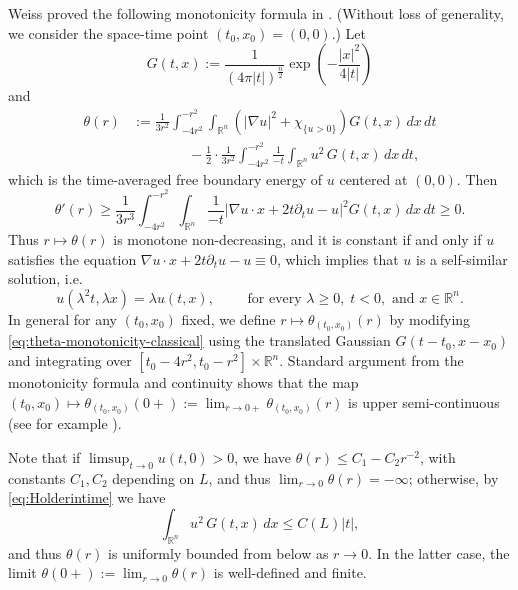 \documentclass[11pt]{article}
\numberwithin{equation}{section}
\theoremstyle{definition}
\newcommand{\RR}{\mathbb{R}}
\begin{document}
Weiss proved the following monotonicity formula in \cite[Theorem 3.1]{Weiss99}. (Without loss of generality, we consider the space-time point $(t_0, x_0) = (0,0)$.) Let
\[ G(t,x) := \frac{1}{(4\pi|t|)^{\frac{n}{2}}} \exp\left(-\frac{|x|^2}{4|t|} \right) \]
and
\begin{align}
    \theta(r) & := \frac{1}{3r^2} \int_{-4r^2}^{-r^2} \int_{\RR^n} \left(|\nabla u|^2 + \chi_{\{u>0\}} \right) G(t,x) \, dx\, dt \nonumber \\
	& \qquad \qquad - \frac12 \cdot \frac{1}{3r^2} \int_{-4r^2}^{-r^2} \frac{1}{-t} \int_{\RR^n}  u^2\, G(t,x) \, dx\, dt,\label{def:theta}
\end{align}
which is the time-averaged free boundary energy of $u$ centered at $(0,0)$.
Then
\begin{equation} \label{eq:theta-monotonicity-classical}
	\theta'(r) \geq \frac{1}{3r^3} \int_{-4r^2}^{-r^2} \int_{\RR^n} \frac{1}{-t}\left|\nabla u \cdot x + 2t \partial_t u - u \right|^2 G(t,x) \, dx\,dt \geq 0.
\end{equation}
Thus $r \mapsto \theta(r)$ is monotone non-decreasing, and it is constant if and only if $u$ satisfies the equation $\nabla u \cdot x + 2t \partial_t u - u \equiv 0$, which implies that $u$ is a self-similar solution, i.e.
\[ u(\lambda^2 t, \lambda x) = \lambda u(t,x), \qquad \text{ for every }\lambda \geq 0,\; t<0,\text{ and } x\in \RR^n. \]
In general for any $(t_0,x_0)$ fixed, we define $r \mapsto \theta_{(t_0,x_0)}(r)$ by modifying \eqref{eq:theta-monotonicity-classical} using the translated Gaussian $G(t-t_0, x-x_0)$ and integrating over $[t_0-4r^2, t_0-r^2]\times \mathbb{R}^n$. Standard argument from the monotonicity formula and continuity shows that the map $(t_0,x_0) \mapsto \theta_{(t_0,x_0)}(0+):= \lim_{r\to 0+} \theta_{(t_0,x_0)}(r)$ is upper semi-continuous (see for example \cite[Lemma 8.1 (4)]{Weiss}).

Note that if $\limsup_{t\to 0} u(t,0)>0$, we have $\theta(r) \leq C_1 - C_2 r^{-2}$, with constants $ C_1, C_2$ depending on $L$, and thus $\lim_{r\to 0}\theta(r) = -\infty$; otherwise, by \eqref{eq:Holderintime} we have
\begin{equation*}
    \int_{\RR^n}  u^2\, G(t,x) \, dx \leq C(L) |t|, 
\end{equation*} 
and thus $\theta(r)$ is uniformly bounded from below as $r\to 0$. In the latter case, the limit $\theta(0+):= \lim_{r\to 0} \theta(r)$ is well-defined and finite.
\end{document}
